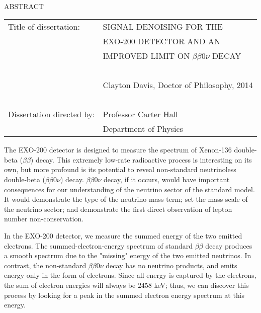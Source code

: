 
\hbox{\ }

\renewcommand{\baselinestretch}{1}
\small \normalsize

\begin{center}
\large{{ABSTRACT}} 

\vspace{3em} 

\end{center}
\hspace{-.15in}
\begin{tabular}{ll}
Title of dissertation:    & {\large  SIGNAL DENOISING FOR THE }\\
&                           {\large EXO-200 DETECTOR AND AN} \\
&				      {\large IMPROVED LIMIT ON $\beta\beta 0\nu$ DECAY} \\
\ \\
&                          {\large  Clayton Davis, Doctor of Philosophy, 2014} \\
\ \\
Dissertation directed by: & {\large  Professor Carter Hall} \\
&  				{\large	 Department of Physics } \\
\end{tabular}

\vspace{3em}

\renewcommand{\baselinestretch}{2}
\large \normalsize

The EXO-200 detector is designed to measure the spectrum of Xenon-136 double-beta ($\beta\beta$) decay.  This extremely low-rate radioactive process is interesting on its own, but more profound is its potential to reveal non-standard neutrinoless double-beta ($\beta\beta 0\nu$) decay.  $\beta\beta 0\nu$ decay, if it occurs, would have important consequences for our understanding of the neutrino sector of the standard model.  It would demonstrate the type of the neutrino mass term; set the mass scale of the neutrino sector; and demonstrate the first direct observation of lepton number non-conservation.

In the EXO-200 detector, we measure the summed energy of the two emitted electrons.  The summed-electron-energy spectrum of standard $\beta\beta$ decay produces a smooth spectrum due to the "missing" energy of the two emitted neutrinos.  In contrast, the non-standard $\beta\beta 0\nu$ decay has no neutrino products, and emits energy only in the form of electrons.  Since all energy is captured by the electrons, the sum of electron energies will always be $2458$ keV; thus, we can discover this process by looking for a peak in the summed electron energy spectrum at this energy.

